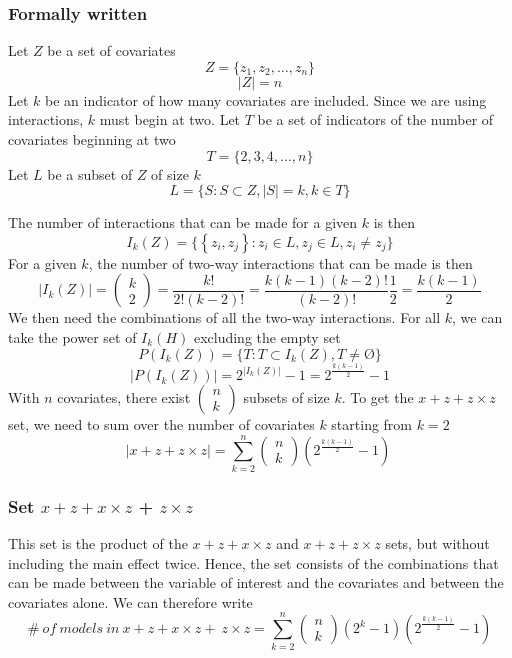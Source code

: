 \subsubsection{Formally written}
Let $Z$ be a set of covariates 
\[Z=\{\left.z_1,z_2,\dots ,z_n\right.\}\] 
\[|Z|=n\] 
Let $k$ be an indicator of how many covariates are included. Since we are using interactions, $k$ must begin at two. Let $T$ be a set of indicators of the number of covariates beginning at two
\[T=\{\left.2,3,4,\dots ,n\right.\}\] 
Let $L$ be a subset of $Z$ of size $k$
\[L=\{\left.S:S\subset Z,\left|S\right|=k,k\in T\right.\}\] 

The number of interactions that can be made for a given $k$ is then
\[I_k\left(Z\right)=\{\left\{\left.z_i,z_j\right\}:z_i\in L,z_j\in L,z_i\neq z_j\right.\}\] 
For a given $k$, the number of two-way interactions that can be made is then
\[\left|I_k\left(Z\right)\right|=\left( \begin{array}{c}
k \\ 
2 \end{array}
\right)=\frac{k!}{2!\left(k-2\right)!}=\frac{k\left(k-1\right)\left(k-2\right)!}{\left(k-2\right)!}\frac{1}{2}=\frac{k\left(k-1\right)}{2}\] 
We then need the combinations of all the two-way interactions. For all $k$, we can take the power set of $I_k\left(H\right)$ excluding the empty set
\[P\left(I_k\left(Z\right)\right)=\{\left.T:T\subset I_k\left(Z\right),T\neq \textrm{\O}\right.\}\] 
\[\left|P\left(I_k\left(Z\right)\right)\right|=2^{\left|I_k\left(Z\right)\right|}-1=2^{\frac{k\left(k-1\right)}{2}}-1\] 
With $n$ covariates, there exist $\left( \begin{array}{c}
n \\ 
k \end{array}
\right)$ subsets of size $k$. To get the $x + z + z \times z$ set, we need to sum over the number of covariates $k$ starting from $k=2$
\[\left|x + z+z \times z\right|=\sum^n_{k=2}{\left( \begin{array}{c}
n \\ 
k \end{array}
\right)}\left(2^{\frac{k\left(k-1\right)}{2}}-1\right)\ \] 

\subsubsection{Set $x + z + x \times z$ + $z \times z$}
This set is the product of the $x + z + x \times z$ and $x + z + z \times z$ sets, but without including the main effect twice. Hence, the set consists of the combinations that can be made between the variable of interest and the covariates and between the covariates alone. We can therefore write 
\[\#\ of\ models\ in\ x + z + x \times z+\ z \times z=\sum^n_{k=2}{\left( \begin{array}{c}
n \\ 
k \end{array}
\right)\left(2^k-1\right)\left(2^{\frac{k\left(k-1\right)}{2}}-1\right)}\] 

